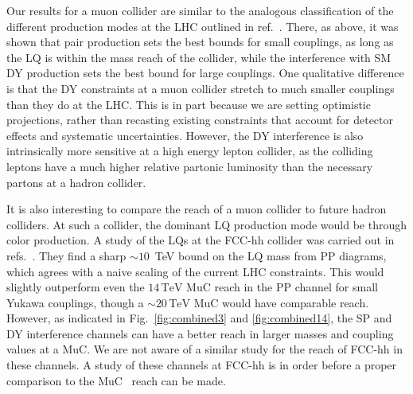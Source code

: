 \documentclass[a4paper,11pt]{article}
\newcommand{\muc}{MuC}
\begin{document}
Our results for a muon collider are similar to the analogous classification of the different production modes at the LHC outlined in ref.~\cite{Schmaltz:2018nls}.
There, as above, it was shown that pair production sets the best bounds for small couplings, as long as the LQ is within the mass reach of the collider, while the interference with SM DY production sets the best bound for large couplings.
One qualitative difference is that the DY constraints at a muon collider stretch to much smaller couplings than they do at the LHC. This is in part because we are setting optimistic projections, rather than recasting existing constraints that account for detector effects and systematic uncertainties. However, the DY interference is also intrinsically more sensitive at a high energy lepton collider, as the colliding leptons have a much higher relative partonic luminosity than the necessary partons at a hadron collider.








It is also interesting to compare the reach of a muon collider to future hadron colliders. 
At such a collider, the dominant LQ production mode would be through color production. 
A study of the LQs at the FCC-hh collider was carried out in refs.~\cite{Allanach:2017bta,Allanach:2019zfr}. 
They find a sharp $\sim 10$~TeV bound on the LQ mass from PP diagrams, which agrees with a naive scaling of the current LHC constraints. 
This would slightly outperform even the $14\,\textrm{TeV}$ \muc{} reach in the PP channel for small Yukawa couplings, though a $\sim 20\,\textrm{TeV}$ \muc{} would have comparable reach. 
However, as indicated in Fig.~\ref{fig:combined3} and \ref{fig:combined14}, the SP and DY interference channels can have a better reach in larger masses and coupling values at a \muc. 
We are not aware of a similar study for the reach of FCC-hh in these channels. A study of these channels at FCC-hh is in order before a proper comparison to the \muc~ reach can be made.
\end{document}
